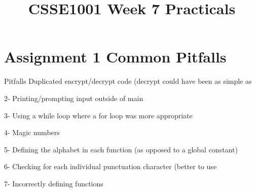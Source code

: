 \documentclass[week2]{csse1001}
\title{CSSE1001 Week 7 Practicals}
\begin{document}
\begin{frame} 
\maketitle
\end{frame}

\section{Assignment 1 Common Pitfalls}

\begin{topic}{Pitfalls}
Duplicated encrypt/decrypt code (decrypt could have been as simple as 

\begin{subtopic}{2-}
Printing/prompting input outside of main
\end{subtopic}

\begin{subtopic}{3-}
Using a while loop where a for loop was more appropriate
\end{subtopic}

\begin{subtopic}{4-}
Magic numbers
\end{subtopic}

\begin{subtopic}{5-}
Defining the alphabet in each function (as opposed to a global constant)
\end{subtopic}

\begin{subtopic}{6-}
Checking for each individual punctuation character (better to use 
\end{subtopic}

\begin{subtopic}{7-}
Incorrectly defining functions
\end{subtopic}

\end{topic}
\end{document}
